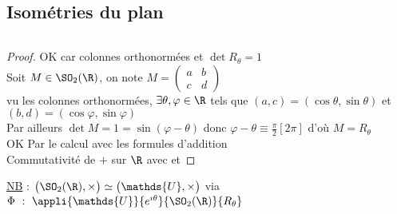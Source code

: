 	\subsection{Isométries du plan}
		${}$ \\ 
		\begin{proof}
		\un \fbox{$\supset$} OK car colonnes orthonormées et $\det R_\theta = 1$ \\
		\fbox{$\subset$} Soit $M\in\SO_2(\R)$, on note $M=\left( \begin{array}{cc} a&b \\ c&d \end{array}\right)$\\
		vu les colonnes orthonormées, $\exists \theta,\varphi\in \R$ tels que $(a,c)= (\cos\theta, \sin\theta)$ et $(b,d)=(\cos\varphi,\sin\varphi)$\\
		Par ailleurs $\det M=1 = \sin(\varphi-\theta)$ donc $\varphi-\theta \equiv \frac{\pi}{2} [2\pi]$ d'où $M=R_\theta$\\
		\deux OK Par le calcul avec les formules d'addition\\
		\trois Commutativité de $+$ sur $\R$ avec \un et \deux
		\end{proof}
		\uline{NB} : $\big( \SO_2(\R),\times \big) \simeq \big( \mathds{U} , \times \big)$ via $\Phi ~:~ \appli{\mathds{U}}{e^{\imath\theta}}{\SO_2(\R)}{R_\theta}$
		\vspace*{0.5cm} \\  \newpage \traitd
